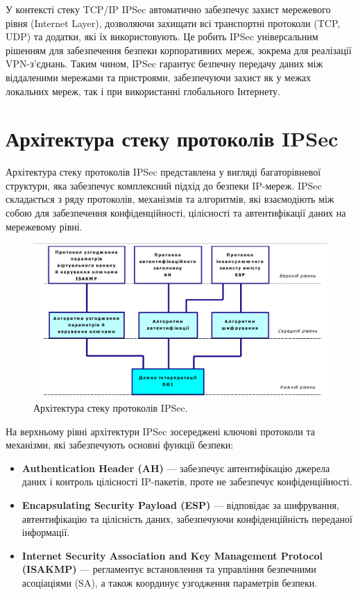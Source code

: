 У контексті стеку TCP/IP IPSec автоматично забезпечує захист мережевого рівня (Internet Layer), дозволяючи захищати всі транспортні протоколи (TCP, UDP) та додатки, які їх використовують. Це робить IPSec універсальним рішенням для забезпечення безпеки корпоративних мереж, зокрема для реалізації VPN-з'єднань. Таким чином, IPSec гарантує безпечну передачу даних між віддаленими мережами та пристроями, забезпечуючи захист як у межах локальних мереж, так і при використанні глобального Інтернету.

\section{Архітектура стеку протоколів IPSec}

Архітектура стеку протоколів IPSec представлена у вигляді багаторівневої структури, яка забезпечує комплексний підхід до безпеки IP-мереж. IPSec складається з ряду протоколів, механізмів та алгоритмів, які взаємодіють між собою для забезпечення конфіденційності, цілісності та автентифікації даних на мережевому рівні.

\begin{figure}[h!]
    \centering
    \includegraphics[scale=0.33]{IMAGES/IPSec_architecture.png}
    \caption{Архітектура стеку протоколів IPSec.}
    \label{fig_ipsec_architecture}
\end{figure}

На верхньому рівні архітектури IPSec зосереджені ключові протоколи та механізми, які забезпечують основні функції безпеки:
\begin{itemize}
    \item \textbf{Authentication Header (AH)} — забезпечує автентифікацію джерела даних і контроль цілісності IP-пакетів, проте не забезпечує конфіденційності.
    \item \textbf{Encapsulating Security Payload (ESP)} — відповідає за шифрування, автентифікацію та цілісність даних, забезпечуючи конфіденційність переданої інформації.
    \item \textbf{Internet Security Association and Key Management Protocol (ISAKMP)} — регламентує встановлення та управління безпечними асоціаціями (SA), а також координує узгодження параметрів безпеки.
\end{itemize}

